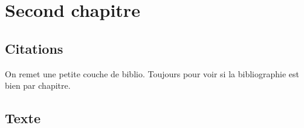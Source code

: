 \chapter{Second chapitre}

\minitoc

\section{Citations}

On remet une petite couche de biblio\cite{Kresse1993}. Toujours pour voir si la
bibliographie est bien par chapitre\cite{Kresse1996}.

\lipsum[13-16]

\section{Texte}

\lipsum[17-21]

